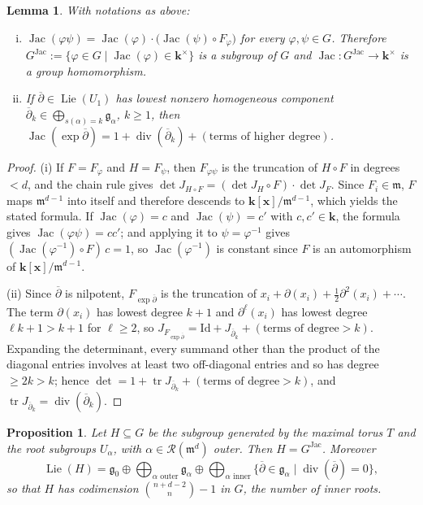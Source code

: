 \documentclass[11pt,letterpaper,reqno]{amsart}
\newtheorem{lemma}[lemma]{Lemma}
\newtheorem{proposition}[proposition]{Proposition}
\theoremstyle{remark}
\theoremstyle{definition}
\def\M{\mathfrak{m}}
\def\XX{\mathbf{x}}
\newcommand{\KK}[0]{\ensuremath{\mathbf{k}}}
\newcommand{\R}{\mathcal R}
\newcommand{\jac}[0]{\ensuremath{\operatorname{Jac}}}
\newcommand{\divi}[0]{\ensuremath{\operatorname{div}}}
\begin{document}
\begin{lemma}\label{lem:anick-jac}
With notations as above:
\begin{enumerate}[(i)]
\item $\jac(\varphi\psi)=\jac(\varphi)\cdot\bigl(\jac(\psi)\circ F_\varphi\bigr)$ for every $\varphi,\psi\in G$. Therefore $G^{\jac}:=\{\varphi\in G\mid\jac(\varphi)\in\KK^\times\}$ is a subgroup of $G$ and $\jac\colon G^{\jac}\to\KK^\times$ is a group homomorphism.
\item If $\overline{\partial}\in\operatorname{Lie}(U_1)$ has lowest nonzero homogeneous component $\overline{\partial}_k\in \bigoplus_{s(\alpha)=k}\mathfrak g_\alpha$, $k\geq 1$, then $\jac(\exp \overline{\partial})=1+\divi(\overline{\partial}_k)+(\text{terms of higher degree})$.
\end{enumerate}
\end{lemma}

\begin{proof}
\textup{(i)} If $F=F_\varphi$ and $H=F_\psi$, then $F_{\varphi\psi}$ is the truncation of $H\circ F$ in degrees $<d$, and the chain rule gives
$\det J_{H\circ F}=(\det J_H\circ F)\cdot\det J_F$. Since $F_i\in\M$, $F$ maps $\M^{d-1}$ into itself and therefore descends to $\KK[\XX]/\M^{d-1}$, which yields the
stated formula. If $\jac(\varphi)=c$ and $\jac(\psi)=c'$ with $c,c'\in\KK$, the formula gives $\jac(\varphi\psi)=cc'$; and applying it to $\psi=\varphi^{-1}$ gives
$(\jac(\varphi^{-1})\circ F)\,c=1$, so $\jac(\varphi^{-1})$ is constant since $F$ is an automorphism of
$\KK[\XX]/\M^{d-1}$.

\textup{(ii)} Since $\overline{\partial}$ is nilpotent, $F_{\exp \overline{\partial}}$ is the truncation of
$x_i+\partial(x_i)+\tfrac12\partial^2(x_i)+\cdots$. The term $\partial(x_i)$ has lowest degree $k+1$ and
$\partial^{\ell}(x_i)$ has lowest degree $\ell k+1>k+1$ for $\ell\geq2$, so
$J_{F_{\exp \overline{\partial}}}=\mathrm{Id}+J_{\overline{\partial}_k}+(\text{terms of degree}>k)$. Expanding the determinant,
every summand other than the product of the diagonal entries involves at least two
off-diagonal entries and so has degree $\geq2k>k$; hence
$\det=1+\operatorname{tr}J_{\overline{\partial}_k}+(\text{terms of degree}>k)$, and
$\operatorname{tr}J_{\overline{\partial}_k}=\divi(\overline{\partial}_k)$.
\end{proof}

\begin{proposition}\label{prop:anick-outer}
Let $H\subseteq G$ be the subgroup generated by the maximal torus $T$ and the root
subgroups $U_\alpha$, with $\alpha\in\R(\M^d)$ outer. Then $H=G^{\jac}$. Moreover
$$\operatorname{Lie}(H)=\mathfrak g_0\oplus\bigoplus_{\alpha\text{ outer}} \mathfrak g_\alpha\oplus\bigoplus_{\alpha\text{ inner}}\{\overline{\partial}\in\mathfrak g_\alpha\mid \divi(\overline{\partial})=0\},$$
so that $H$ has codimension $\binom{n+d-2}{n}-1$ in $G$, the number of inner roots.
\end{proposition}
\end{document}
